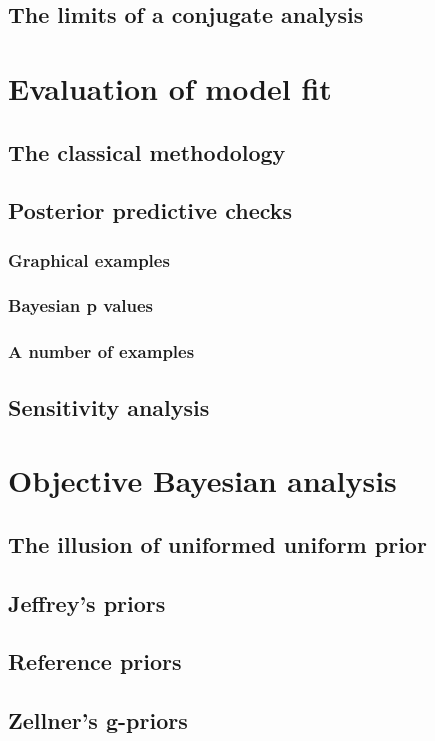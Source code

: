 \documentclass[11pt,fullpage]{book}
\begin{document}
\section{The limits of a conjugate analysis}

\chapter{Evaluation of model fit}\label{chap:ModelFit}
\section{The classical methodology}
\section{Posterior predictive checks}
\subsection{Graphical examples}
\subsection{Bayesian p values}
\subsection{A number of examples}
\section{Sensitivity analysis}


\chapter{Objective Bayesian analysis}\label{chap:ObjectiveBayes}
\section{The illusion of uniformed uniform prior}
\section{Jeffrey's priors}
\section{Reference priors}
\section{Zellner's g-priors}
\end{document}
